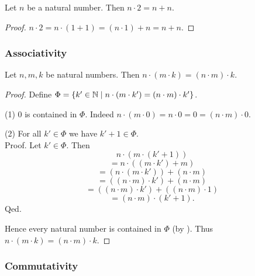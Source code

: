 \documentclass[10pt]{article}
\begin{document}
  \begin{forthel}
    \begin{corollary}
      Let $n$ be a natural number.
      Then $n \cdot 2 = n + n$.
    \end{corollary}
    \begin{proof}
      $n \cdot 2
        = n \cdot (1 + 1)
        = (n \cdot 1) + n
        = n + n$.
    \end{proof}
  \end{forthel}


  \subsubsection*{Associativity}

  \begin{forthel}
    \begin{proposition}
      Let $n, m, k$ be natural numbers.
      Then $n \cdot (m \cdot k) = (n \cdot m) \cdot k$.
    \end{proposition}
    \begin{proof}
      Define $\Phi = \{ k' \in \mathbb{N} \mid n \cdot (m \cdot k') = (n \cdot m) \cdot k' \}$.

      (1) $0$ is contained in $\Phi$.
      Indeed $n \cdot (m \cdot 0)
        = n \cdot 0
        = 0
        = (n \cdot m) \cdot 0$.

      (2) For all $k' \in \Phi$ we have $k' + 1 \in \Phi$. \\
      Proof.
        Let $k' \in \Phi$.
        Then
        \[  n \cdot (m \cdot (k' + 1))                          \]
        \[    = n \cdot ((m \cdot k') + m)                      \]
        \[    = (n \cdot (m \cdot k')) + (n \cdot m)            \]
        \[    = ((n \cdot m) \cdot k') + (n \cdot m)            \]
        \[    = ((n \cdot m) \cdot k') + ((n \cdot m) \cdot 1)  \]
        \[    = (n \cdot m) \cdot (k' + 1).                     \]
      Qed.

      Hence every natural number is contained in $\Phi$ (by ).
      Thus $n \cdot (m \cdot k) = (n \cdot m) \cdot k$.
    \end{proof}
  \end{forthel}


  \subsubsection*{Commutativity}
\end{document}
